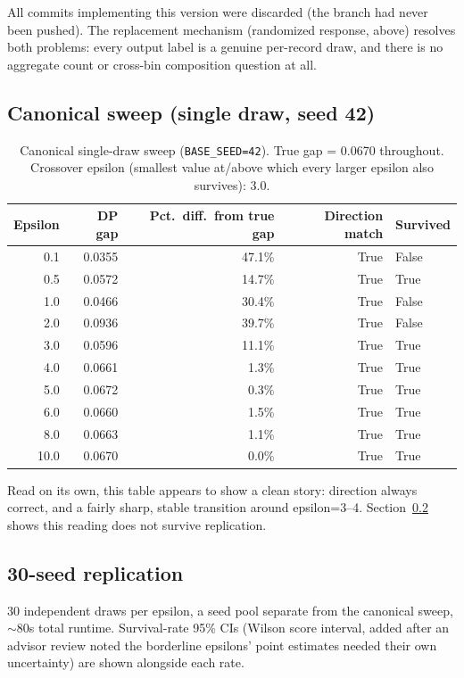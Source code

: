\documentclass[11pt]{article}
\begin{document}
All commits implementing this version were discarded (the branch had never been pushed). The replacement mechanism (randomized response, above) resolves both problems: every output label is a genuine per-record draw, and there is no aggregate count or cross-bin composition question at all.

\subsection{Canonical sweep (single draw, seed 42)}

\begin{table}[H]
\centering
\begin{tabular}{rrrrl}
\toprule
Epsilon & DP gap & Pct.\ diff.\ from true gap & Direction match & Survived \\
\midrule
0.1 & 0.0355 & 47.1\% & True & False \\
0.5 & 0.0572 & 14.7\% & True & True \\
1.0 & 0.0466 & 30.4\% & True & False \\
2.0 & 0.0936 & 39.7\% & True & False \\
3.0 & 0.0596 & 11.1\% & True & True \\
4.0 & 0.0661 & 1.3\% & True & True \\
5.0 & 0.0672 & 0.3\% & True & True \\
6.0 & 0.0660 & 1.5\% & True & True \\
8.0 & 0.0663 & 1.1\% & True & True \\
10.0 & 0.0670 & 0.0\% & True & True \\
\bottomrule
\end{tabular}
\caption{Canonical single-draw sweep (\texttt{BASE\_SEED=42}). True gap = 0.0670 throughout. Crossover epsilon (smallest value at/above which every larger epsilon also survives): 3.0.}
\label{tab:canonical-sweep}
\end{table}

Read on its own, this table appears to show a clean story: direction always correct, and a fairly sharp, stable transition around epsilon=3--4. Section~\ref{sec:replication} shows this reading does not survive replication.

\subsection{30-seed replication}
\label{sec:replication}

30 independent draws per epsilon, a seed pool separate from the canonical sweep, $\sim$80s total runtime. Survival-rate 95\% CIs (Wilson score interval, added after an advisor review noted the borderline epsilons' point estimates needed their own uncertainty) are shown alongside each rate.
\end{document}
